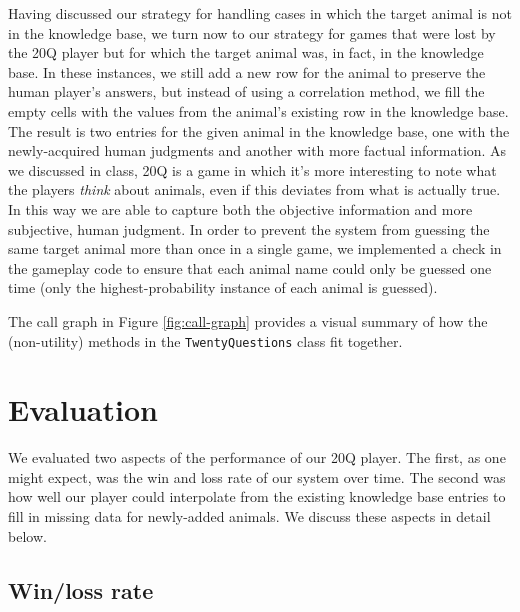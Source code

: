 \documentclass[11pt,a4paper]{article}
\begin{document}
Having discussed our strategy for handling cases in which the target animal is not in the knowledge base, we turn now to our strategy for games that were lost by the 20Q player but for which the target animal was, in fact, in the knowledge base. 
In these instances, we still add a new row for the animal to preserve the human player's answers, but instead of using a correlation method, we fill the empty cells with the values from the animal's existing row in the knowledge base. 
The result is two entries for the given animal in the knowledge base, one with the newly-acquired human judgments and another with more factual information. 
As we discussed in class, 20Q is a game in which it's more interesting to note what the players \textit{think} about animals, even if this deviates from what is actually true. 
In this way we are able to capture both the objective information and more subjective, human judgment. 
In order to prevent the system from guessing the same target animal more than once in a single game, we implemented a check in the gameplay code to ensure that each animal name could only be guessed one time (only the highest-probability instance of each animal is guessed).  

\vspace{\baselineskip}

\noindent The call graph in Figure \ref{fig:call-graph} provides a visual summary of how the (non-utility) methods in the \texttt{TwentyQuestions} class fit together.

\section{Evaluation}
\label{sec:eval}

We evaluated two aspects of the performance of our 20Q player. 
The first, as one might expect, was the win and loss rate of our system over time. 
The second was how well our player could interpolate from the existing knowledge base entries to fill in missing data for newly-added animals.
We discuss these aspects in detail below.

\subsection{Win/loss rate}
\label{subsec:eval-win-loss}
\end{document}
